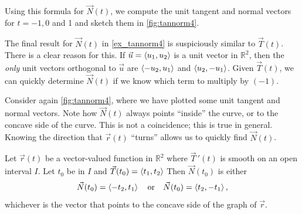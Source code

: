 \begin{example}

Using this formula for $\vec N(t)$, we compute the unit tangent and normal vectors for $t=-1,0$ and 1 and sketch them in \autoref{fig:tannorm4}.
\end{example}

The final result for $\vec N(t)$ in \autoref{ex_tannorm4} is suspiciously similar to $\vec T(t)$. There is a clear reason for this. If $\vec u =\left\langle u_1,u_2\right\rangle$ is a unit vector in $\mathbb{R}^2$, then the \emph{only} unit vectors orthogonal to $\vec u$ are $\left\langle -u_2,u_1\right\rangle$ and $\left\langle u_2,-u_1\right\rangle$. Given $\vec T(t)$, we can quickly determine $\vec N(t)$ if we know which term to multiply by $(-1)$.

Consider again \autoref{fig:tannorm4}, where we have plotted some unit tangent and normal vectors. Note how $\vec N(t)$ always points ``inside'' the curve, or to the concave side of the curve. This is not a coincidence; this is true in general. Knowing the direction that $\vec r(t)$ ``turns'' allows us to quickly find $\vec N(t)$.


\begin{theorem}\label{thm:concave}%
Let $\vec r(t)$ be a vector-valued function in $\mathbb{R}^2$ where $\vec T\,'(t)$ is smooth on an open interval $I$. Let $t_0$ be in $I$ and $\vec T(t_0) =\left\langle t_1,t_2\right\rangle$ Then $\vec N(t_0)$ is either
\[\vec N(t_0) =\left\langle -t_2,t_1\right\rangle\quad \text{or}\quad \vec N(t_0) =\left\langle t_2,-t_1\right\rangle,\]
whichever is the vector that points to the concave side of the graph of $\vec r$.
\end{theorem}

